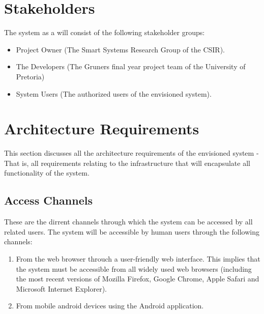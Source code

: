 \documentclass[12pt]{article}
\begin{document}
                \vspace{0.2in}
                \section{Stakeholders}
                \vspace{0.1in}
                 The system as a will consist of the following stakeholder groups:
                 \begin{itemize}
	                 \item Project Owner (The Smart Systems Research Group of the CSIR).
	                 \item The Developers (The Gruners final year project team of the University of Pretoria)
	                 \item System Users (The authorized users of the envisioned system).
	                 
                 \end{itemize}
                 
                 \section{Architecture Requirements}
                 	\vspace{0.1in}
                 	This section discusses all the architecture requirements of the envisioned system - That is, all requirements relating to the infrastructure that will encapsulate all functionality of the system. 
                 	
                    \subsection{Access Channels}
                    \vspace{0.1in}
                    These are the dirrent channels through which the system can be accessed by all related users.
                    The system will be accessible by human users through the following channels:
                    	\begin{enumerate}
	                    	\item From the web browser throuch a user-friendly web interface. This implies that the system must be accessible from all widely used web browsers (including the most recent versions of Mozilla Firefox, Google Chrome, Apple Safari and Microsoft Internet Explorer).
	                    	\item From mobile android devices using the Android application.
                    	\end{enumerate}
                    	
\end{document}
